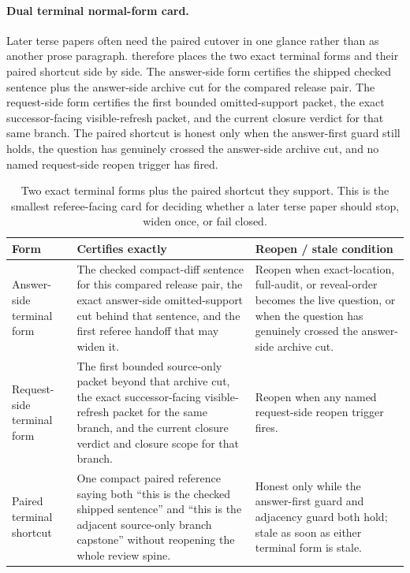 \documentclass[11pt]{article}
\begin{document}
\paragraph{Dual terminal normal-form card.}
Later terse papers often need the paired cutover in one glance rather than as another prose paragraph.
 therefore places the two exact terminal forms and their paired shortcut side by side.
The answer-side form certifies the shipped checked sentence plus the answer-side archive cut for the compared release pair.
The request-side form certifies the first bounded omitted-support packet, the exact successor-facing visible-refresh packet, and the current closure verdict for that same branch.
The paired shortcut is honest only when the answer-first guard still holds, the question has genuinely crossed the answer-side archive cut, and no named request-side reopen trigger has fired.

\begin{table}[t]
\centering
\small
\begin{tabularx}{\linewidth}{@{}Y Y Y@{}}
\toprule
Form & Certifies exactly & Reopen / stale condition \\
\midrule
Answer-side terminal form & The checked compact-diff sentence for this compared release pair, the exact answer-side omitted-support cut behind that sentence, and the first referee handoff that may widen it. & Reopen when exact-location, full-audit, or reveal-order becomes the live question, or when the question has genuinely crossed the answer-side archive cut. \\
Request-side terminal form & The first bounded source-only packet beyond that archive cut, the exact successor-facing visible-refresh packet for the same branch, and the current closure verdict and closure scope for that branch. & Reopen when any named request-side reopen trigger fires. \\
Paired terminal shortcut & One compact paired reference saying both ``this is the checked shipped sentence'' and ``this is the adjacent source-only branch capstone'' without reopening the whole review spine. & Honest only while the answer-first guard and adjacency guard both hold; stale as soon as either terminal form is stale. \\
\bottomrule
\end{tabularx}
\caption{Two exact terminal forms plus the paired shortcut they support. This is the smallest referee-facing card for deciding whether a later terse paper should stop, widen once, or fail closed.}
\label{tab:workedexample-dual-terminal-card}
\end{table}
\end{document}
